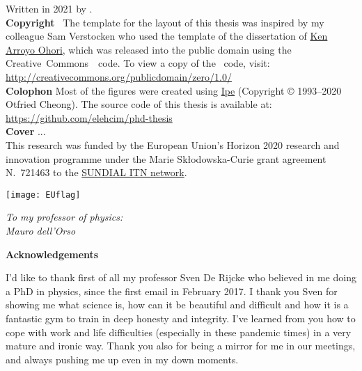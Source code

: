 \clearpage
\thispagestyle{empty}
\null%
\label{thesis:colophon}
\vfill
{}
\noindent Written in 2021 by {\makeatletter{\@author}\makeatother}.\\
\textbf{Copyright}~\cczero{} The template for the layout of this thesis was inspired by my colleague Sam Verstocken who used the template of the dissertation of \href{ken.mx}{Ken Arroyo Ohori},
which was released into the public domain using the Creative~Commons~\cczero{}~code.
To view a copy of the \cczero{}~code, visit:\\\url{http://creativecommons.org/publicdomain/zero/1.0/}\\
\textbf{Colophon}
Most of the figures were created using \href{http://ipe.otfried.org/}{Ipe} (Copyright © 1993–2020 Otfried Cheong).
The source code of this thesis is available at: \\
\url{https://github.com/elehcim/phd-thesis}\\
\textbf{Cover}
...\\[2ex]
This research was funded by the European Union's Horizon 2020 research and innovation programme under the Marie Sk\l odowska-Curie
grant agreement N.~721463 to the \href{www.astro.rug.nl/~sundial}{SUNDIAL ITN network}.
\begin{figure*}[bh!]
  \centering
  \texttt{[image: EUflag]}
\end{figure*}

\clearpage
\thispagestyle{empty}
\null%
\vfill
\begin{flushright}
  \textit{To my professor of physics:\\
      Mauro dell'Orso\\
      }
\end{flushright}
\vfill

\clearpage
\thispagestyle{empty}
\null%
\label{thesis:acknowledgements}
  \begin{center}
    {\Large \textbf{Acknowledgements}}\\
  \end{center}
I'd like to thank first of all my professor Sven De Rijcke who believed in me doing a PhD in physics, since the first email in February 2017.
I thank you Sven for showing me what science is, how can it be beautiful and difficult and how it is a fantastic gym to train in deep honesty and integrity.
I've learned from you how to cope with work and life difficulties (especially in these pandemic times) in a very mature and ironic way.
Thank you also for being a mirror for me in our meetings, and always pushing me up even in my down moments.

